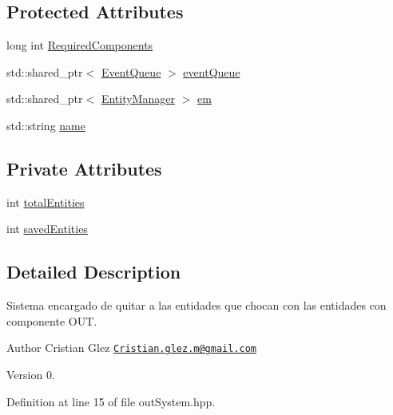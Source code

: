 \subsection*{Protected Attributes}
\begin{DoxyCompactItemize}
\item 
long int \hyperlink{classant_1_1_system_a4ef41cfc496e41ac6730f90629524ec7}{Required\+Components}
\item 
std\+::shared\+\_\+ptr$<$ \hyperlink{classant_1_1_event_queue}{Event\+Queue} $>$ \hyperlink{classant_1_1_system_a27e1814e13d161b5ef0e848e3da16d29}{event\+Queue}
\item 
std\+::shared\+\_\+ptr$<$ \hyperlink{classant_1_1_entity_manager}{Entity\+Manager} $>$ \hyperlink{classant_1_1_system_a5661d872ff769be150bd4e9a9552f6b9}{em}
\item 
std\+::string \hyperlink{classant_1_1_system_a60b3c00a760a3b4947ab1f1fc534a5b2}{name}
\end{DoxyCompactItemize}
\subsection*{Private Attributes}
\begin{DoxyCompactItemize}
\item 
int \hyperlink{classant_1_1out_system_ac4f71f8c4634833fa70672b9738c2d87}{total\+Entities}
\item 
int \hyperlink{classant_1_1out_system_af701a5815e678816eb1a32587373acd7}{saved\+Entities}
\end{DoxyCompactItemize}


\subsection{Detailed Description}
Sistema encargado de quitar a las entidades que chocan con las entidades con componente O\+U\+T. 

\begin{DoxyAuthor}{Author}
Cristian Glez \href{mailto:Cristian.glez.m@gmail.com}{\tt Cristian.\+glez.\+m@gmail.\+com} 
\end{DoxyAuthor}
\begin{DoxyVersion}{Version}
0. 
\end{DoxyVersion}


Definition at line 15 of file out\+System.\+hpp.



